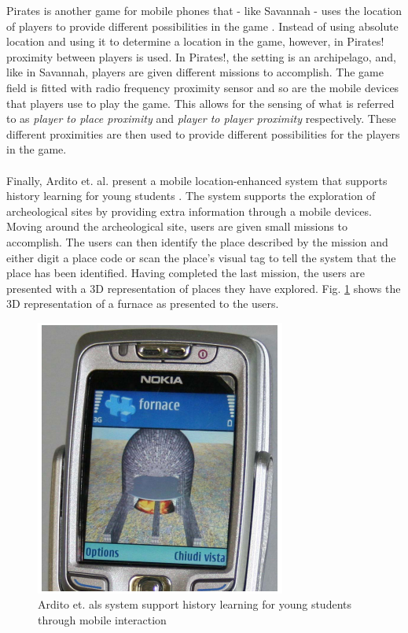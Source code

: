 Pirates is another game for mobile phones that - like Savannah - uses the location of players to provide different possibilities in the game \cite{Falk:2001:PPI:634067.634140}. Instead of using absolute location and using it to determine a location in the game, however, in Pirates! proximity between players is used. In Pirates!, the setting is an archipelago, and, like in Savannah, players are given different missions to accomplish. The game field is fitted with radio frequency proximity sensor and so are the mobile devices that players use to play the game. This allows for the sensing of what is referred to as \emph{player to place proximity} and \emph{player to player proximity} respectively. These different proximities are then used to provide different possibilities for the players in the game.
\\\\
Finally, Ardito et. al. present a mobile location-enhanced system that supports history learning for young students \cite{4351331}. The system supports the exploration of archeological sites by providing extra information through a mobile devices. Moving around the archeological site, users are given small missions to accomplish. The users can then identify the place described by the mission and either digit a place code or scan the place's visual tag to tell the system that the place has been identified. Having completed the last mission, the users are presented with a 3D representation of places they have explored. Fig. \ref{fig:ardito} shows the 3D representation of a furnace as presented to the users.

\begin{figure}
	\centering
	\includegraphics[scale=0.6]{fig/ardito}
	\caption{Ardito et. als \cite{4351331} system support history learning for young students through mobile interaction}
	\label{fig:ardito}
\end{figure}


